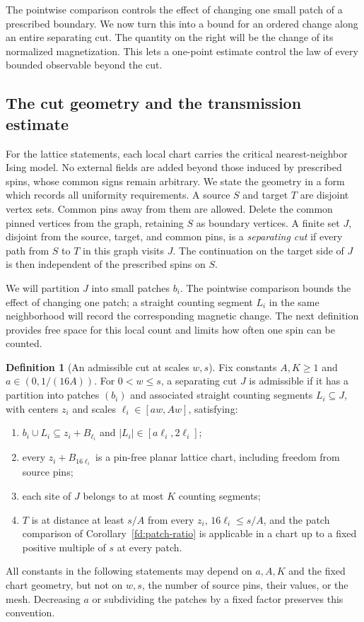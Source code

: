 \documentclass[11pt]{article}
\theoremstyle{definition}
\newtheorem{definition}[theorem]{Definition}
\theoremstyle{remark}
\numberwithin{equation}{section}
\begin{document}
The pointwise comparison controls the effect of changing one small patch
of a prescribed boundary. We now turn this into a bound for an ordered
change along an entire separating cut. The quantity on the right will be
the change of its normalized magnetization. This lets a one-point
estimate control the law of every bounded observable beyond the cut.

\subsection{The cut geometry and the transmission estimate}

For the lattice statements, each local chart carries the critical
nearest-neighbor Ising model. No external fields are added beyond those
induced by prescribed spins, whose common signs remain arbitrary. We state the geometry
in a form which records all uniformity requirements.
A source $S$ and target $T$ are disjoint vertex sets. Common pins away
from them are allowed. Delete the common pinned vertices from the graph,
retaining $S$ as boundary vertices. A finite set $J$, disjoint from the
source, target, and common pins, is a \emph{separating cut} if every path
from $S$ to $T$ in this graph visits $J$. The continuation on the target
side of $J$ is then independent of the prescribed spins on $S$.

We will partition $J$ into small patches $b_i$. The pointwise comparison
bounds the effect of changing one patch; a straight counting segment
$L_i$ in the same neighborhood will record the corresponding magnetic
change. The next definition provides free space for this local count
and limits how often one spin can be counted.

\begin{definition}[An admissible cut at scales $w,s$]
\label{tr:admissible}
Fix constants $A,K\geq1$ and $a\in(0,1/(16A))$. For $0<w\leq s$, a separating cut
$J$ is admissible if it has a partition into patches $(b_i)$ and associated
straight counting segments $L_i\subseteq J$, with centers $z_i$ and
scales $\ell_i\in[aw,Aw]$, satisfying:
\begin{enumerate}
\item $b_i\cup L_i\subseteq z_i+B_{\ell_i}$ and
$|L_i|\in[a\ell_i,2\ell_i]$;
\item every $z_i+B_{16\ell_i}$ is a pin-free planar lattice chart,
including freedom from source pins;
\item each site of $J$ belongs to at most $K$ counting segments;
\item $T$ is at distance at least $s/A$ from every $z_i$,
$16\ell_i\leq s/A$, and the
patch comparison of Corollary~\ref{fd:patch-ratio} is applicable in a chart
up to a fixed positive multiple of $s$ at every patch.
\end{enumerate}
All constants in the following statements may depend on $a,A,K$ and the
fixed chart geometry, but not on $w,s$, the number of source pins, their
values, or the mesh. Decreasing $a$ or subdividing the patches by a fixed
factor preserves this convention.
\end{definition}
\end{document}
